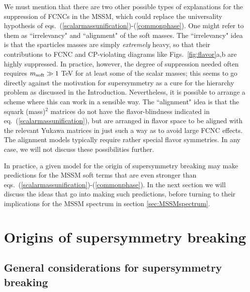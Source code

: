 We must mention that there are two other possible
types of explanations for
the suppression of FCNCs in the MSSM, which
could replace the universality hypothesis of
eqs.~(\ref{scalarmassunification})-(\ref{commonphase}).
One might refer to them as
``irrelevancy" and ``alignment" of the soft masses. The ``irrelevancy"
idea is that the sparticles masses are simply {\it extremely}
heavy, so that
their contributions to FCNC and CP-violating diagrams like
Figs.~\ref{fig:flavor}a,b are highly suppressed. In practice, however, the
degree of suppression needed often requires $m_{\rm soft} \gg 1$
TeV for at least some of the scalar masses; this seems to go directly
against the motivation for supersymmetry
as a cure for the hierarchy problem as discussed in the
Introduction. Nevertheless, it is possible to arrange a scheme where
this can work in a sensible way.\cite{Moreminimal} The ``alignment" idea
is that the squark (mass)$^2$ matrices do not have the flavor-blindness
indicated in eq.~(\ref{scalarmassunification}), but are arranged in flavor
space to be aligned with the relevant Yukawa matrices in just such a way
as to avoid large FCNC effects.\cite{cterms,alignmentmodels} The alignment
models typically require
rather special flavor symmetries.
In any case, we will not discuss these possibilities
further.

In practice, a given model for the origin of supersymmetry
breaking may make predictions for the MSSM soft terms
that are even stronger than
eqs.~(\ref{scalarmassunification})-(\ref{commonphase}).
 In the next section we will discuss the ideas that go
into making such predictions, before turning to their implications
for the MSSM spectrum in section \ref{sec:MSSMspectrum}.

\section{Origins of supersymmetry breaking}\label{sec:origins}
\subsection{General considerations for
supersymmetry breaking}\label{subsec:origins.general}
\setcounter{equation}{0}
\setcounter{footnote}{1}


